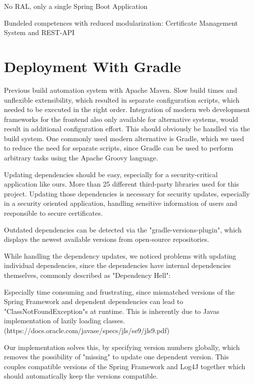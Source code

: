 No RAL, only a single Spring Boot Application

Bundeled competences with reduced modularization: Certificate Management System and REST-API

\section{Deployment With Gradle}
Previous build automation system with Apache Maven.
Slow build times and unflexible extensibility, which resulted in separate configuration scripts, which needed to be
executed in the right order.
Integration of modern web development frameworks for the frontend also only available for alternative systems, would
result in additional configuration effort.
This should obviously be handled via the build system.
One commonly used modern alternative is Gradle, which we used to reduce the need for separate scripts, since Gradle can
be used to perform arbitrary tasks using the Apache Groovy language.

Updating dependencies should be easy, especially for a security-critical application like ours.
More than 25 different third-party libraries used for this project.
Updating those dependencies is necessary for security updates, especially in a security oriented application, handling
sensitive information of users and responsible to secure certificates.

Outdated dependencies can be detected via the "gradle-versions-plugin", which displays the newest available versions
from open-source repositories. %

While handling the dependency updates, we noticed problems with updating individual dependencies, since the dependencies
have internal dependencies themselves, commonly described as "Dependency Hell": %

Especially time consuming and frustrating, since mismatched versions of the Spring Framework and dependent dependencies
can lead to "ClassNotFoundException"s at runtime.
This is inherently due to Javas implementation of lazily loading classes.
(https://docs.oracle.com/javase/specs/jls/se9/jls9.pdf)

Our implementation solves this, by specifying version numbers globally, which removes the possibility of "missing" to
update one dependent version.
This couples compatible versions of the Spring Framework and Log4J together which should automatically keep the versions
compatible.


